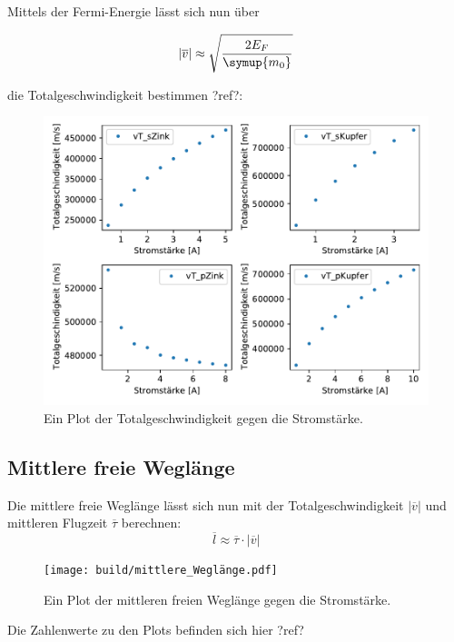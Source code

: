     Mittels der Fermi-Energie lässt sich nun über 

    \begin{equation}
        |\overline{v}| \approx \sqrt{\frac{2E_F}{\symup{m_0}}} \nonumber
    \end{equation}

    die Totalgeschwindigkeit bestimmen ?ref?: 

    \begin{figure}[H]
        \centering
        \includegraphics[width=1.1\textwidth]{build/Totalgeschwindigkeit.pdf}
        \caption{Ein Plot der Totalgeschwindigkeit gegen die Stromstärke.}
        \label{img:vT}
    \end{figure}


    \subsection{Mittlere freie Weglänge}


    Die mittlere freie Weglänge lässt sich nun mit der Totalgeschwindigkeit $|\overline{v}|$ und mittleren Flugzeit $\overline{\tau}$ berechnen:
    \begin{equation}
        \overline{l} \approx \overline{\tau} \cdot |\overline{v}| \nonumber
    \end{equation}

    
    \begin{figure}[H]
        \centering
        \texttt{[image: build/mittlere\_Weglänge.pdf]}
        \caption{Ein Plot der mittleren freien Weglänge gegen die Stromstärke.}
        \label{img:mfl}
    \end{figure}
    \noindent
    Die Zahlenwerte zu den Plots befinden sich hier ?ref?


